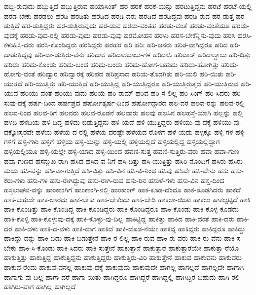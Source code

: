 {ಹಬ್ಬಿ-ರುವುದು
ಹಬ್ಬುತ್ತಿದೆ
ಹಬ್ಬುತ್ತಿರುವ
ಹಯಾಸಿಂತ್
ಹರ
ಹರಕೆ
ಹರಕೆ-ಯನ್ನು
ಹರಟುತ್ತಿದ್ದನು
ಹರಟೆ
ಹರಟೆ-ಯಲ್ಲಿ
ಹರಡ-ಬೇಕು
ಹರಡಲು
ಹರಡಿ
ಹರಡಿತು
ಹರಡಿದ
ಹರಡಿ-ದರು
ಹರಡಿದೆ
ಹರಡಿದ್ದವು
ಹರಡಿ-ರುವ
ಹರ-ಡುತ್ತ
ಹರ-ಡುತ್ತಿದೆ
ಹರ-ಡುತ್ತಿದ್ದರು
ಹರ-ಡುತ್ತಿರುವುದು
ಹರ-ಡುವ
ಹರಡು-ವಂತಹ
ಹರಡು-ವಂತೆ
ಹರಡು-ವಂತೆಯೂ
ಹರಡು-ವುದಕ್ಕೆ
ಹರಡು-ವುದ-ರಲ್ಲಿ
ಹರಡು-ವುದು
ಹರಡು-ವುವು
ಹರಮೋಹನ
ಹರಳು
ಹರಸ-ಬೇಕೆನ್ನಿಸು-ವುದು
ಹರಸಿ
ಹರಸಿ-ಕಳುಹಿಸಿ-ದರು
ಹರಸಿ-ಕೊಂಡಿದ್ದರು
ಹರಸಿದ್ದರು
ಹರಹರ
ಹರಿ
ಹರಿಃ
ಹರಿ-ಜನರು
ಹರಿತ-ವಾಗಿದ್ದರೂ
ಹರಿದ
ಹರಿ-ದಾಡುತ್ತಿದ್ದವು
ಹರಿ-ದಾ-ಡುತ್ತಿರು-ವನು
ಹರಿದಾಸ
ಹರಿದಾಸಬಾಬು-ಗಳ
ಹರಿದಾಸಿ
ಹರಿದಾಸ್
ಹರಿದಾಸ್ಬಾಬು
ಹರಿ-ದಿತ್ತು
ಹರಿದು
ಹರಿದು-ಕೊಂಡು
ಹರಿದು-ಬಂದ
ಹರಿದು-ಬಂದು
ಹರಿದು-ಹೋಗ-ಬಹುದು
ಹರಿದು-ಹೋಗಿತ್ತು
ಹರಿದು-ಹೋಗು-ವಂತೆ
ಹರಿದ್ವಾರ
ಹರಿದ್ವಾರಕ್ಕೆ
ಹರಿಪದ
ಹರಿಪ್ರಸಾದ
ಹರಿಯ-ತೊಡಗಿತು
ಹರಿ-ಯಲಿ
ಹರಿ-ಯಿತು
ಹರಿ-ಯುತ್ತದೆ
ಹರಿ-ಯುತ್ತಿತ್ತು
ಹರಿ-ಯುತ್ತಿದೆ
ಹರಿ-ಯುತ್ತಿದ್ದ
ಹರಿ-ಯುತ್ತಿದ್ದರೂ
ಹರಿ-ಯುತ್ತಿರುತ್ತದೆ
ಹರಿ-ಯುತ್ತಿರುವ
ಹರಿ-ಯುವ
ಹರಿಯು-ವಂತೆ
ಹರಿಯು-ವುದು
ಹರಿಯೆ
ಹರಿ-ರಾಮ್
ಹರಿವ
ಹರಿ-ಸ-ಲಿಲ್ಲ
ಹರಿ-ಸಿಂಗ್
ಹರಿ-ಸಿದರು
ಹರಿ-ಸುವು-ದಕ್ಕೆ
ಹರ್ಷ-ದಿಂದ
ಹರ್ಷಪ್ರದ
ಹರ್ಷೋತ್ಕರ್ಷ-ದಿಂದ
ಹರ್ಷೋದ್ಗಾರದ
ಹಲ-ವರ
ಹಲವ-ರನ್ನು
ಹಲವ-ರಲ್ಲಿ
ಹಲವ-ರಿಂದ
ಹಲವ-ರಿಗೆ
ಹಲವರು
ಹಲವ-ರೊಡನೆ
ಹಲವಾರು
ಹಲವು
ಹಲಸಿನ
ಹಲಹಸ್ತೆ-ಯಾಗಿ
ಹಲ್ಲನ್ನು
ಹಲ್ಲಿ
ಹಳದಿ
ಹಳದಿಯ
ಹಳಿ-ದಿದ್ದ
ಹಳಿದು-ಬಿಡುತ್ತಿದ್ದನು
ಹಳಿ-ಯದೆ
ಹಳಿ-ಯುತ್ತಿದ್ದರು
ಹಳಿಯು-ವು-ದಕ್ಕೆ
ಹಳಿಯು-ವು-ದಕ್ಕೋಸ್ಕರವೇ
ಹಳೆಯ
ಹಳೆಯ-ದ-ರಲ್ಲಿ
ಹಳೆಯ-ದರಷ್ಟೇ
ಹಳೆಯದ-ರೊಳಗೆ
ಹಳೆ-ಯದು
ಹಳ್ಳಕ್ಕೂ
ಹಳ್ಳಿ-ಗಳ
ಹಳ್ಳಿ-ಗಳಿಗೆ
ಹಳ್ಳಿ-ಗಳು
ಹಳ್ಳಿಗೆ
ಹಳ್ಳಿಯ
ಹಳ್ಳಿ-ಯನ್ನು
ಹಳ್ಳಿ-ಯಲ್ಲಿ
ಹಳ್ಳಿಯಲ್ಲಿದೆ
ಹಳ್ಳಿಯಲ್ಲಿದ್ದ
ಹಳ್ಳಿಯಲ್ಲಿದ್ದಾಗ
ಹಳ್ಳಿಯಲ್ಲಿಯೂ
ಹಳ್ಳಿ-ಯಲ್ಲೇ
ಹಳ್ಳಿ-ಯಾದ
ಹಳ್ಳಿ-ಯಿಂದ
ಹವಣಿ-ಸುತ್ತ
ಹವಣಿ-ಸುತ್ತಿರು-ವರು
ಹವಾ
ಹವಾ-ಗುಣ
ಹವಾ-ಗುಣದ
ಹಸನ್ಮುಖ-ರಾಗಿ
ಹಸಿದ
ಹಸಿದ-ವ-ನಿಗೆ
ಹಸಿ-ದಿತ್ತು
ಹಸಿ-ಯುತ್ತಿತ್ತು
ಹಸಿರಿ-ನೊಂದಿಗೆ
ಹಸಿರು
ಹಸಿರು-ಮಯ
ಹಸಿ-ವನ್ನು
ಹಸಿ-ವಾ-ಗುತ್ತಿದೆ
ಹಸಿ-ವಿತ್ತು
ಹಸಿ-ವಿನ
ಹಸಿ-ವಿ-ನಿಂದ
ಹಸಿವು
ಹಸಿವೇ
ಹಸಿ-ವೇನು
ಹಸು
ಹಸು-ಕರು-ಗಳು
ಹಸು-ಗಳ
ಹಸು-ರಾಗಿದ್ದುವು
ಹಸು-ರಾಗಿ-ರುವ
ಹಸು-ರಿನ
ಹಸುಳೆ-ಗಳು
ಹಸು-ವಿನ
ಹಸ್ತ-ದಿಂದ
ಹಸ್ತಲಾಘವ-ವನ್ನು
ಹಾಂಕಾಂಗಿಗೆ
ಹಾಂಕಾಂಗಿ-ನಲ್ಲಿ
ಹಾಂಕಾಂಗ್
ಹಾಕ-ಕೂಡ-ದೆಂದೂ
ಹಾಕ-ತೊಡಗಿದರು
ಹಾಕದೆ
ಹಾಕ-ಬಹುದೇ
ಹಾಕ-ಬಾರದು
ಹಾಕ-ಬೇಕು
ಹಾಕ-ಬೇಕೆಂದು
ಹಾಕ-ಬೇಡಿ
ಹಾಕಲಾ-ಯಿತು
ಹಾಕಲು
ಹಾಕಲ್ಪಟ್ಟಿದೆ
ಹಾಕಿ
ಹಾಕಿ-ಕೊಂಡಿತ್ತು
ಹಾಕಿ-ಕೊಂಡಿದ್ದ
ಹಾಕಿ-ಕೊಂಡಿದ್ದರು
ಹಾಕಿ-ಕೊಂಡಿದ್ದರೂ
ಹಾಕಿ-ಕೊಂಡು
ಹಾಕಿ-ಕೊಳ್ಳ-ಕೂಡದು
ಹಾಕಿ-ಕೊಳ್ಳಿ
ಹಾಕಿ-ಕೊಳ್ಳುವು-ದಕ್ಕೆ
ಹಾಕಿ-ಕೊಳ್ಳು-ವು-ದಿಲ್ಲ
ಹಾಕಿಟ್ಟಿದ್ದ
ಹಾಕಿತ್ತು
ಹಾಕಿದ
ಹಾಕಿ-ದಂತೆ
ಹಾಕಿ-ದರು
ಹಾಕಿ-ದರೆ
ಹಾಕಿ-ದಳು
ಹಾಕಿ-ದ-ವಳು
ಹಾಕಿ-ದಾಗ
ಹಾಕಿದೆ
ಹಾಕಿ-ದೊಡ-ನೆಯೇ
ಹಾಕಿದ್ದ
ಹಾಕಿದ್ದರು
ಹಾಕಿದ್ದರೂ
ಹಾಕಿದ್ದು
ಹಾಕಿದ್ದು-ದನ್ನು
ಹಾಕಿ-ಬಿಡು
ಹಾಕಿ-ಬಿಡುತ್ತೇನೆ
ಹಾಕಿ-ರ-ಲಿಲ್ಲ
ಹಾಕಿ-ರುವ
ಹಾಕಿ-ರು-ವರು
ಹಾಕಿ-ರು-ವೆನು
ಹಾಕಿ-ಸ-ಬೇಕು
ಹಾಕಿ-ಸಿ-ಕೊಂಡು
ಹಾಕಿ-ಸಿದರು
ಹಾಕಿ-ಸುತ್ತೇನೆ
ಹಾಕುತ್ತಾನೆ
ಹಾಕುತ್ತಾರೆ
ಹಾಕುತ್ತಾರೆಯೇ
ಹಾಕುತ್ತಾ-ರೆಯೊ
ಹಾಕುತ್ತಿತ್ತು
ಹಾಕುತ್ತಿದ್ದ
ಹಾಕುತ್ತಿದ್ದನು
ಹಾಕುತ್ತಿದ್ದರು
ಹಾಕುತ್ತಿರು-ವಿರಿ
ಹಾಕುತ್ತೇನೆ
ಹಾಕುವ
ಹಾಕುವನು
ಹಾಕುವರು
ಹಾಕುವ-ರೆಂದು
ಹಾಕುವ-ವನಲ್ಲ
ಹಾಕುವು-ದಕ್ಕೆ
ಹಾಕುವುದು
ಹಾಕುವುದೇ
ಹಾಗಲ್ಲ
ಹಾಗಲ್ಲದೆ
ಹಾಗಲ್ಲದೇ
ಹಾಗಾಗಿ
ಹಾಗಾಗು-ವು-ದಿಲ್ಲ
ಹಾಗಾ-ದರೆ
ಹಾಗಾ-ಯಿತು
ಹಾಗಿದ್ದರೂ
ಹಾಗಿದ್ದರೆ
ಹಾಗಿದ್ದಲ್ಲಿ
ಹಾಗಿದ್ದಿರ-ಬಹುದು
ಹಾಗಿ-ರಲಿ
ಹಾಗಿರು-ವಾಗ
ಹಾಗಿಲ್ಲ
ಹಾಗಿಲ್ಲದೆ
}
